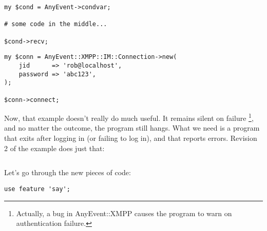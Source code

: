 \begin{shaded}
\begin{verbatim}
my $cond = AnyEvent->condvar;

# some code in the middle...

$cond->recv;
\end{verbatim}
\end{shaded}

\begin{comment}
This is how you run an AnyEvent event loop.  If you're not familiar with AnyEvent, I suggest you read up on it; however, intimate knowledge of it is not necessary for this tutorial.
\end{comment}

\newpage
\begin{shaded}
\begin{verbatim}
my $conn = AnyEvent::XMPP::IM::Connection->new(
    jid      => 'rob@localhost',
    password => 'abc123',
);

$conn->connect;
\end{verbatim}
\end{shaded}

\begin{comment}
Creates a connection object and connects when the event loop starts running.
Authenticates as rob@localhost, using the password 'abc123'.
\end{comment}

\newpage
Now, that example doesn't really do much useful.  It remains silent on failure
\footnote{Actually, a bug in AnyEvent::XMPP causes the program to warn on
authentication failure.}, and no matter the outcome, the program still hangs.
What we need is a program that exits after logging in (or failing to log in),
and that reports errors.  Revision 2 of the example does just that:

\newpage
\begin{shaded}
\inputminted{perl}{examples/simple-bot.pl}
\end{shaded}

\newpage
Let's go through the new pieces of code:

\pause
\begin{shaded}
\begin{verbatim}
use feature 'say';
\end{verbatim}
\end{shaded}

\begin{comment}
This pragma brings in the 'say' function, which is basically print
with a newline.  If you're not using Perl 5.10 later by now, I highly
suggest you do; 5.10 and 5.12 are full of great new features!
\end{comment}

